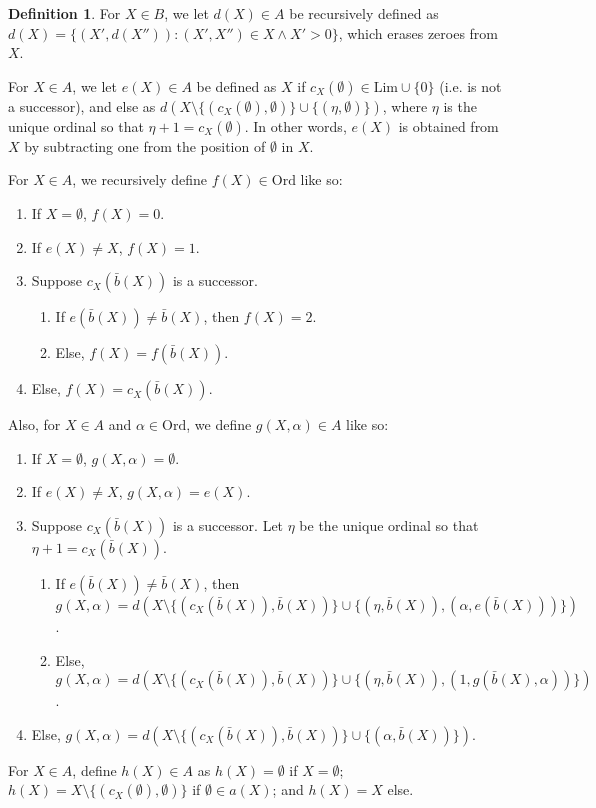 \documentclass{article}
\theoremstyle{definition}
\newtheorem{definition}{Definition}[section]
\theoremstyle{plain}
\theoremstyle{plain}
\theoremstyle{plain}
\theoremstyle{plain}
\theoremstyle{remark}
\theoremstyle{remark}
\theoremstyle{remark}
\theoremstyle{plain}
\theoremstyle{plain}
\begin{document}
\begin{definition}
For $X \in B$, we let $d(X) \in A$ be recursively defined as $d(X) = \{(X',d(X'')): (X',X'') \in X \land X' > 0\}$, which erases zeroes from $X$.

For $X \in A$, we let $e(X) \in A$ be defined as $X$ if $c_X(\emptyset) \in \mathrm{Lim} \cup \{0\}$ (i.e. is not a successor), and else as $d(X \setminus \{(c_X(\emptyset),\emptyset)\}\cup\{(\eta,\emptyset)\})$, where $\eta$ is the unique ordinal so that $\eta+1 = c_X(\emptyset)$. In other words, $e(X)$ is obtained from $X$ by subtracting one from the position of $\emptyset$ in $X$. 

For $X \in A$, we recursively define $f(X) \in \mathrm{Ord}$ like so:

\begin{enumerate}
    \item If $X = \emptyset$, $f(X) = 0$.
    \item If $e(X) \neq X$, $f(X) = 1$.
    \item Suppose $c_X(\bar{b}(X))$ is a successor.
    \begin{enumerate}
        \item If $e(\bar{b}(X)) \neq \bar{b}(X)$, then $f(X) = 2$.
        \item Else, $f(X) = f(\bar{b}(X))$.
    \end{enumerate}
    \item Else, $f(X) = c_X(\bar{b}(X))$.
\end{enumerate}

Also, for $X \in A$ and $\alpha \in \mathrm{Ord}$, we define $g(X, \alpha) \in A$ like so:

\begin{enumerate}
    \item If $X = \emptyset$, $g(X, \alpha) = \emptyset$.
    \item If $e(X) \neq X$, $g(X, \alpha) = e(X)$.
    \item Suppose $c_X(\bar{b}(X))$ is a successor. Let $\eta$ be the unique ordinal so that $\eta+1 = c_X(\bar{b}(X))$.
    \begin{enumerate}
        \item If $e(\bar{b}(X)) \neq \bar{b}(X)$, then $g(X, \alpha) = d(X \setminus \{(c_X(\bar{b}(X)), \bar{b}(X))\} \cup \{(\eta,\bar{b}(X)),(\alpha, e(\bar{b}(X)))\})$.
        \item Else, $g(X, \alpha) = d(X \setminus \{(c_X(\bar{b}(X)), \bar{b}(X))\} \cup \{(\eta,\bar{b}(X)),(1,g(\bar{b}(X),\alpha))\})$.
    \end{enumerate}
    \item Else, $g(X, \alpha) = d(X \setminus \{(c_X(\bar{b}(X)), \bar{b}(X))\} \cup \{(\alpha,\bar{b}(X))\})$.
\end{enumerate}

For $X \in A$, define $h(X) \in A$ as $h(X) = \emptyset$ if $X = \emptyset$; $h(X) = X \setminus \{(c_X(\emptyset), \emptyset)\}$ if $\emptyset \in a(X)$; and $h(X) = X$ else.
\end{definition}
\end{document}

